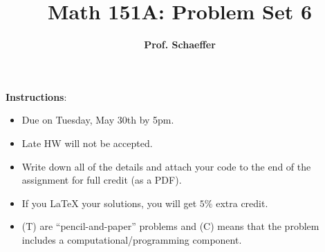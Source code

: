 \documentclass[12pt]{article}
\title{\bf Math 151A: Problem Set 6}
\date{ }
\author{\bf Prof. Schaeffer}
\begin{document}
\maketitle


{\small \textbf{Instructions}:
\begin{itemize}
\item Due on Tuesday, May 30th by 5pm.
\item Late HW will not be accepted.
\item Write down all of the details and attach your code to the end of the assignment for full credit (as a PDF).  
\item If you LaTeX your solutions, you will get $5\%$ extra credit. 
\item (T) are ``pencil-and-paper'' problems and (C) means that the problem includes a computational/programming component. 
\end{itemize}}

\vspace{1em}
\end{document}
